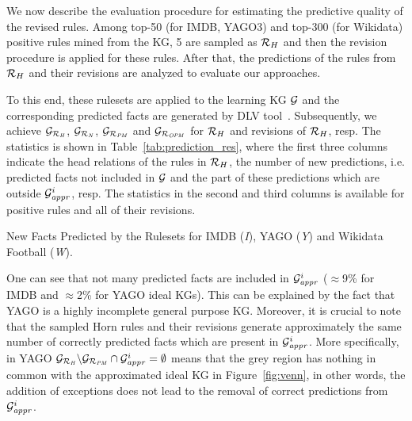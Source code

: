 We now describe the evaluation procedure for estimating the predictive quality of the revised rules. Among top-50 (for IMDB, YAGO3) and top-300 (for Wikidata) positive rules mined from the KG, 5 are sampled as $\mathcal{R}_H$ and then the revision procedure is applied for these rules. After that, the predictions of the rules from $\mathcal{R}_H$ and their revisions are analyzed to evaluate our approaches.

To this end, these rulesets are applied to the learning KG $\mathcal{G}$ and the corresponding predicted facts are generated by DLV tool~\cite{dlv}. Subsequently, we achieve $\mathcal{G}_{\mathcal{R}_{\mathit{H}}}$, $\mathcal{G}_{\mathcal{R}_{\mathit{N}}}$, $\mathcal{G}_{\mathcal{R}_{\mathit{PM}}}$ and $\mathcal{G}_{\mathcal{R}_{\mathit{OPM}}}$ for $\mathcal{R}_H$ and revisions of $\mathcal{R}_H$, resp. The statistics is shown in Table~\ref{tab:prediction_res}, where the first three columns indicate the head relations of the rules in $\mathcal{R}_H$, the number of new predictions, i.e. predicted facts not included in $\mathcal{G}$ and the part of these predictions which are outside $\mathcal{G}^i_{\mathit{appr}}$, resp. The statistics in the second and third columns is available for positive rules and all of their revisions.

\begin{table}[ht]
\centering

\smallskip
\caption{New Facts Predicted by the Rulesets for IMDB (\textit{I}), YAGO (\textit{Y}) and Wikidata Football (\textit{W}).}
\label{tab:prediction_res}
\end{table}

One can see that not many predicted facts are included in $\mathcal{G}^i_{\mathit{appr}}$ ($\approx$9\% for IMDB and $\approx$2\% for YAGO ideal KGs). This can be explained by the fact that YAGO is a highly incomplete general purpose KG. Moreover, it is crucial to note that the sampled Horn rules and their revisions generate approximately the same number of correctly predicted facts which are present in $\mathcal{G}^i_{\mathit{appr}}$. More specifically, in YAGO $\mathcal{G}_{\mathit{\mathcal{R}_H}}\backslash \mathcal{G}_{\mathit{\mathcal{R}_{PM}}} \cap \mathcal{G}^i_{\mathit{appr}}=\emptyset$ means that the grey region has nothing in common with the approximated ideal KG in Figure~\ref{fig:venn}, in other words, the addition of exceptions does not lead to the removal of correct predictions from $\mathcal{G}^i_{\mathit{appr}}$.

